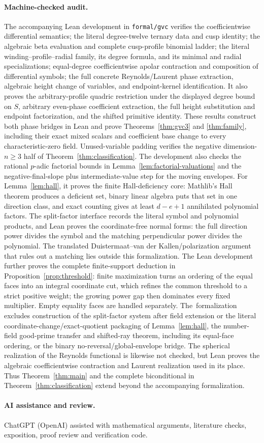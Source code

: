 \documentclass[11pt]{article}
\begin{document}
\paragraph{Machine-checked audit.}
The accompanying Lean development in \texttt{formal/gvc} verifies the
coefficientwise differential semantics; the literal degree-twelve ternary
data and cusp identity; the algebraic beta evaluation and complete
cusp-profile binomial ladder; the literal winding--profile--radial family,
its degree formula, and its minimal and radial specializations;
equal-degree coefficientwise apolar
contraction and composition of differential symbols; the full concrete
Reynolds/Laurent phase extraction, algebraic height change of variables, and
endpoint-kernel identification.  It also proves the arbitrary-profile
quadric restriction under the displayed degree bound on $S$, arbitrary
even-phase coefficient extraction, the full height substitution and
endpoint factorization, and the shifted primitive identity.  These results
construct both phase bridges in Lean and prove
Theorems~\ref{thm:gvc3} and \ref{thm:family}, including their exact mixed
scalars and coefficient base change to every characteristic-zero field.
Unused-variable padding verifies the negative dimension-$n\ge3$ half of
Theorem~\ref{thm:classification}.  The development also checks the rational
$p$-adic factorial bounds in
Lemma~\ref{lem:factorial-valuations} and the negative-final-slope plus
intermediate-value step for the moving envelopes.  For
Lemma~\ref{lem:hall}, it proves the finite Hall-deficiency core: Mathlib's
Hall theorem produces a deficient set, binary linear algebra puts that set
in one direction class, and exact counting gives at least $d-e+1$
annihilated polynomial factors.  The split-factor interface records the
literal symbol and polynomial products, and Lean proves the coordinate-free
normal forms: the full direction power divides the symbol and the matching
perpendicular power divides the polynomial.  The translated
Duistermaat--van der Kallen/polarization argument that rules out a matching
lies outside this formalization.  The Lean development further proves the
complete finite-support deduction in Proposition~\ref{prop:threshold}:
finite maximization turns an ordering of the equal faces into an integral
coordinate cut, which refines the common threshold to a strict positive
weight; the growing power gap then dominates every fixed multiplier.  Empty
equality faces are handled separately.
The~formalization excludes construction of the split-factor
system after field extension or the literal coordinate-change/exact-quotient
packaging of Lemma~\ref{lem:hall}, the number-field
good-prime transfer and shifted-ray theorem, including its equal-face
ordering, or the binary no-reversal/global-envelope bridge.  The spherical realization of the
Reynolds functional is likewise not checked, but Lean proves the algebraic
coefficientwise contraction and Laurent realization used in its place.
Thus Theorem~\ref{thm:main} and the complete biconditional in
Theorem~\ref{thm:classification} extend beyond the accompanying formalization.

\paragraph{AI assistance and review.}
ChatGPT (OpenAI) assisted with mathematical arguments, literature checks,
exposition, proof review and verification code.



\end{document}
